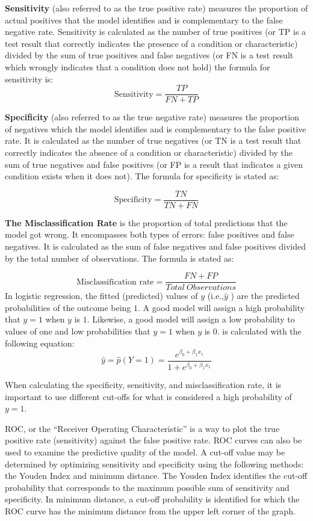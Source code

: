 \documentclass[
]{article}
\begin{document}
\textbf{Sensitivity} (also referred to as the true positive rate)
measures the proportion of actual positives that the model identifies
and is complementary to the false negative rate. Sensitivity is
calculated as the number of true positives (or TP is a test result that
correctly indicates the presence of a condition or characteristic)
divided by the sum of true positives and false negatives (or FN is a
test result which wrongly indicates that a condition does not hold) the
formula for sensitivity is: \[\text{Sensitivity} = \frac{TP}{FN + TP}\]
\hspace{0pt}

\textbf{Specificity} (also referred to as the true negative rate)
measures the proportion of negatives which the model identifies and is
complementary to the false positive rate. It is calculated as the number
of true negatives (or TN is a test result that correctly indicates the
absence of a condition or characteristic) divided by the sum of true
negatives and false positives (or FP is a result that indicates a given
condition exists when it does not). The formula for specificity is
stated as:

\[\text{Specificity} = \frac{TN}{TN + FN}\]

\textbf{The Misclassification Rate} is the proportion of total
predictions that the model got wrong. It encompasses both types of
errors: false positives and false negatives. It is calculated as the sum
of false negatives and false positives divided by the total number of
observations. The formula is stated as:

\[\text{Misclassification rate} = \frac{FN+FP}{Total\ Observations}\] In
logistic regression, the fitted (predicted) values of \(y\)
(i.e.,\(\widehat{y}\) ) are the predicted probabilities of the outcome
being \(1\). A good model will assign a high probability that \(y=1\)
when \(y\) is \(1\). Likewise, a good model will assign a low
probability to values of one and low probabilities that \(y=1\) when
\(y\) is \(0\). is calculated with the following equation:
\[\hat{y} = \hat{p}(Y=1) = \frac{e^{\beta_0 + \beta_1 x_1}}{1 + e^{\beta_0 + \beta_1 x_1}}\]

When calculating the specificity, sensitivity, and misclassification
rate, it is important to use different cut-offs for what is considered a
high probability of \(y=1\).

ROC, or the ``Receiver Operating Characteristic'' is a way to plot the
true positive rate (sensitivity) against the false positive rate. ROC
curves can also be used to examine the predictive quality of the model.
A cut-off value may be determined by optimizing sensitivity and
specificity using the following methods: the Youden Index and minimum
distance. The Youden Index identifies the cut-off probability that
corresponds to the maximum possible sum of sensitivity and specificity.
In minimum distance, a cut-off probability is identified for which the
ROC curve has the minimum distance from the upper left corner of the
graph.
\end{document}
